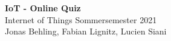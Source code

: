 \documentclass[paper=a0,pagesize,parskip=half-,fontsize=24.88pt, landscape]{scrartcl}
\begin{document}
\begin{minipage}[b]{0.74\linewidth}
  \Huge\textbf{IoT - Online Quiz}\\[1cm]
  \huge{Internet of Things Sommersemester 2021}\\[1cm] 
  \LARGE{Jonas Behling, Fabian Lignitz, Lucien Siani}\\[0.4cm]
\end{minipage}
\end{document}
